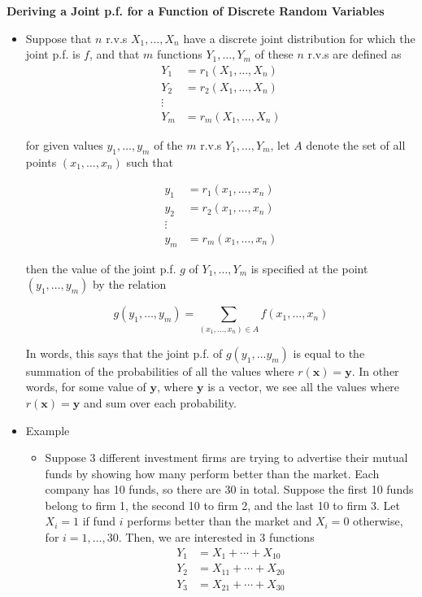 \documentclass[11pt]{article}
\begin{document}
\textbf{Deriving a Joint p.f. for a Function of Discrete Random Variables}
\begin{itemize}
    \item Suppose that $n$ r.v.s $X_1, \ldots, X_n$ have a discrete joint distribution for 
    which the joint p.f. is $f$, and that $m$ functions $Y_1, \ldots, Y_m$ of these $n$ r.v.s
    are defined as 
    \begin{align*}
        Y_1 &= r_1(X_1, \ldots, X_n) \\
        Y_2 &= r_2(X_1, \ldots, X_n) \\
        \vdots \\
        Y_m &= r_m(X_1, \ldots, X_n)
    \end{align*}

    for given values $y_1, \ldots, y_m$ of the $m$ r.v.s $Y_1, \ldots, Y_m$, let $A$ denote
    the set of all points $(x_1, \ldots, x_n)$ such that

    \begin{align*}
        y_1 &= r_1(x_1, \ldots, x_n) \\
        y_2 &= r_2(x_1, \ldots, x_n) \\
        \vdots \\ 
        y_m &= r_m(x_1, \ldots, x_n)
    \end{align*}

    then the value of the joint p.f. $g$ of $Y_1, \ldots, Y_m$ is specified at the point 
    $(y_1, \ldots, y_m)$ by the relation 

    \[g(y_1, \ldots, y_m) = \sum_{(x_1, \ldots, x_n) \in A} f(x_1, \ldots, x_n)\]

    In words, this says that the joint p.f. of $g(y_1, \ldots y_m)$ is equal to the summation 
    of the probabilities of all the values where $r(\boldsymbol{x})= \boldsymbol{y}$. In other 
    words, for some value of $\boldsymbol{y}$, where $\boldsymbol{y}$ is a vector, we see all 
    the values where $r(\boldsymbol{x})= \boldsymbol{y}$ and sum over each probability.

    \item Example 
    \begin{itemize}
        \item Suppose 3 different investment firms are trying to advertise their mutual funds 
        by showing how many perform better than the market. Each company has 10 funds, so 
        there are 30 in total. Suppose the first 10 funds belong to firm 1, the second 10 to
        firm 2, and the last 10 to firm 3. Let $X_i=1$ if fund $i$ performs better than the 
        market and $X_i=0$ otherwise, for $i=1, \ldots, 30$. Then, we are interested in 3 
        functions
        \begin{align*}
            Y_1 &= X_{1}+ \cdots + X_{10} \\
            Y_2 &= X_{11} + \cdots + X_{20} \\
            Y_3 &= X_{21} + \cdots + X_{30}
        \end{align*}


\end{itemize}
\end{itemize}
\end{document}
